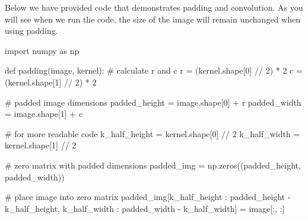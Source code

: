 \documentclass[%
oneside,                 %
final,                   %
10pt]{article}
\begin{document}
Below we have provided code that demonstrates padding and
convolution. As you will see when we run the code, the size of the
image will remain unchanged when using padding.~









































































\bpycod
import numpy as np

def padding(image, kernel):
    # calculate r and c
    r = (kernel.shape[0] // 2) * 2
    c = (kernel.shape[1] // 2) * 2
    
    # padded image dimensions
    padded_height = image.shape[0] + r
    padded_width = image.shape[1] + c
    
    # for more readable code
    k_half_height = kernel.shape[0] // 2
    k_half_width = kernel.shape[1] // 2

    # zero matrix with padded dimensions
    padded_img = np.zeros((padded_height, padded_width))

    # place image into zero matrix
    padded_img[k_half_height : padded_height - k_half_height,
               k_half_width : padded_width - k_half_width] = image[:, :]
\end{document}
